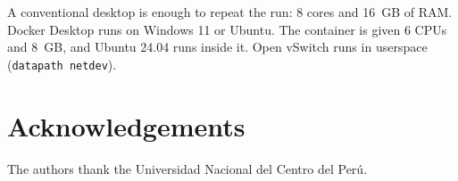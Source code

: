 \documentclass[ASNA,twocolumn]{USG}
\begin{document}
A conventional desktop is enough to repeat the run: 8 cores and
16~GB of RAM. Docker Desktop runs on Windows 11 or Ubuntu. The
container is given 6 CPUs and 8~GB, and Ubuntu 24.04 runs inside it.
Open vSwitch runs in userspace (\texttt{datapath netdev}).

\section*{Acknowledgements}
The authors thank the Universidad Nacional del Centro del Per\'u.


\end{document}
